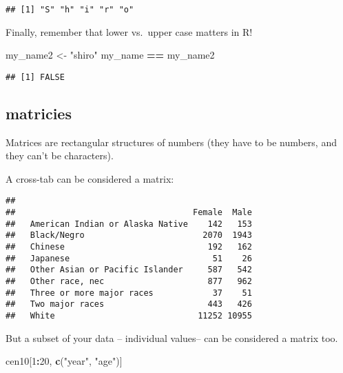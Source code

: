 \documentclass[]{book}
\newenvironment{Shaded}{\begin{snugshade}}{\end{snugshade}}
\newcommand{\KeywordTok}[1]{\textcolor[rgb]{0.13,0.29,0.53}{\textbf{#1}}}
\newcommand{\DecValTok}[1]{\textcolor[rgb]{0.00,0.00,0.81}{#1}}
\newcommand{\StringTok}[1]{\textcolor[rgb]{0.31,0.60,0.02}{#1}}
\newcommand{\OperatorTok}[1]{\textcolor[rgb]{0.81,0.36,0.00}{\textbf{#1}}}
\newcommand{\NormalTok}[1]{#1}
\theoremstyle{definition}
\theoremstyle{definition}
\theoremstyle{definition}
\theoremstyle{remark}
\begin{document}
\begin{verbatim}
## [1] "S" "h" "i" "r" "o"
\end{verbatim}

Finally, remember that lower vs.~upper case matters in R!

\begin{Shaded}
\begin{Highlighting}[]
\NormalTok{my_name2 <-}\StringTok{ "shiro"}
\NormalTok{my_name }\OperatorTok{==}\StringTok{ }\NormalTok{my_name2}
\end{Highlighting}
\end{Shaded}

\begin{verbatim}
## [1] FALSE
\end{verbatim}

\subsection{matricies}\label{matricies}

Matrices are rectangular structures of numbers (they have to be numbers,
and they can't be characters).

A cross-tab can be considered a matrix:

\begin{Shaded}
\end{Shaded}

\begin{verbatim}
##                                   
##                                    Female  Male
##   American Indian or Alaska Native    142   153
##   Black/Negro                        2070  1943
##   Chinese                             192   162
##   Japanese                             51    26
##   Other Asian or Pacific Islander     587   542
##   Other race, nec                     877   962
##   Three or more major races            37    51
##   Two major races                     443   426
##   White                             11252 10955
\end{verbatim}

But a subset of your data -- individual values-- can be considered a
matrix too.

\begin{Shaded}
\begin{Highlighting}[]
\NormalTok{cen10[}\DecValTok{1}\OperatorTok{:}\DecValTok{20}\NormalTok{, }\KeywordTok{c}\NormalTok{(}\StringTok{"year"}\NormalTok{, }\StringTok{"age"}\NormalTok{)]}
\end{Highlighting}
\end{Shaded}
\end{document}
